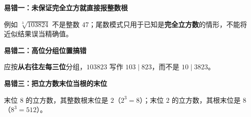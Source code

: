 \clearpage
\begin{trapbox}
\textbf{\textcolor{CTrap}{易错一：未保证完全立方就直接报整数根}}
\par\medskip
\begin{center}

\end{center}
\medskip
例如 $\sqrt[3]{103824}$ 不是整数 $47$；尾数模式只用于已知是\textbf{完全立方数}的情形，不能将近似结果误当精确值。
\end{trapbox}
\clearpage
\begin{trapbox}
\textbf{\textcolor{CTrap}{易错二：高位分组位置搞错}}
\par\medskip
\begin{center}

\end{center}
\medskip
应按\textbf{从右往左每三位}分组，$103823$ 写作 $103\mid823$，而不是 $10\mid3823$。
\end{trapbox}
\clearpage
\begin{trapbox}
\textbf{\textcolor{CTrap}{易错三：把立方数末位当根的末位}}
\par\medskip
\begin{center}

\end{center}
\medskip
末位 $8$ 的立方数，其整数根末位是 $2$（$2^3=8$）；末位 $2$ 的立方数，其根末位是 $8$（$8^3=512$）。
\end{trapbox}
